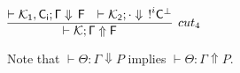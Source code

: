 {\footnotesize
	\vspace{0.2cm}

\begin{center}
	$\infer[cut_4]{\unfoc{\Kcal}{\Gamma}{F}}{
	\deduce{\foc{\Kcal_1,\cutF_i}{\Gamma}{F}}{}
	&
	\deduce{\foc{\Kcal_2}{\cdot}{\nbang{i} \cutF^\perp}}{}
}$
\end{center}
}

\begin{tcolorbox}[colback=red!5!white]
	Note that $\vdash\Theta : \Gamma\Downarrow P$ implies $\vdash\Theta : \Gamma\Uparrow P$.
	
%			
%			
%			
%			
	
	
\end{tcolorbox}

%
%	
	
